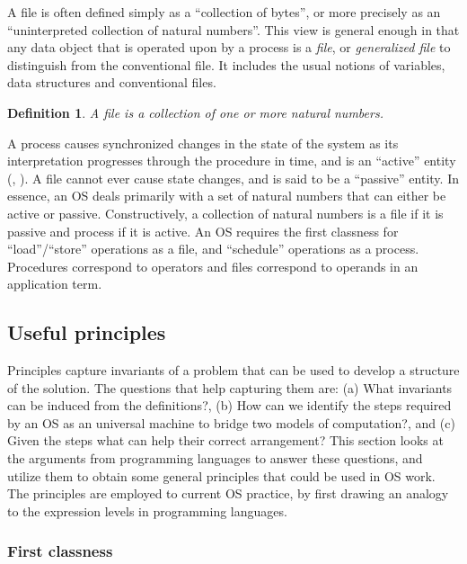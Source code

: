 \documentclass[draft]{article}
\newcounter{thedefn}
\newtheorem{mydefinition}[thedefn]{Definition}
\begin{document}
A file is  often defined simply as a ``collection  of bytes'', or more
precisely as an ``uninterpreted  collection of natural numbers''.  This
view is general  enough in that any data object  that is operated upon
by  a  process  is   a  \emph{file},  or  \emph{generalized  file}  to
distinguish from the conventional file.  It includes the usual notions
of variables, data structures and conventional files.


\begin{mydefinition}
  \label{def:file}
  A \emph{file} is a collection of one or more natural numbers.
\end{mydefinition}

A process  causes synchronized changes in  the state of  the system as
its interpretation progresses through the procedure in time, and is an
``active''        entity       (\cite{Denning:1971:TGC:356593.356595},
\cite{Holt:1972:DPC:850614.850627}).  A  file cannot ever  cause state
changes, and  is said to be  a ``passive'' entity.  In  essence, an OS
deals  primarily with  a set  of natural  numbers that  can  either be
active or passive.  Constructively, a collection of natural numbers is
a file if it  is passive and process if it is  active.  An OS requires
the first  classness for ``load''/``store'' operations as  a file, and
``schedule''  operations  as  a  process.   Procedures  correspond  to
operators and files correspond to operands in an application 
term.

\subsection{Useful principles}
\label{sec:useful:principles}

Principles capture invariants of a problem that can be used to develop
a structure of  the solution.  The questions that  help capturing them
are: (a) What invariants can be induced from the definitions?, (b) How
can we identify the steps required by an OS as an universal machine to
bridge two  models of computation?, and  (c) Given the  steps what can
help their  correct arrangement?  This section looks  at the arguments
from programming languages to answer these questions, and utilize them
to obtain some general principles that  could be used in OS work.  The
principles are  employed to current  OS practice, by first  drawing an
analogy to the expression levels in programming languages.

\subsubsection{First classness}
\label{sec:first:classness}
\end{document}
